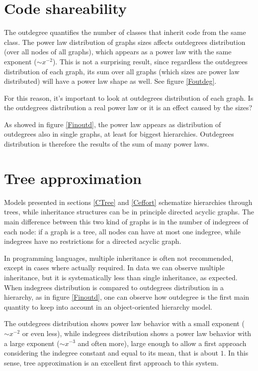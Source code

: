 \section{Code shareability}
The outdegree quantifies the number of classes that inherit code from the same class. The power law distribution of graphs sizes affects outdegrees distribution (over all nodes of all graphs), which appears as a power law with the same exponent ($\sim x^{-2}$). This is not a surprising result, since regardless the outdegrees distribution of each graph, its sum over all graphs (which sizes are power law distributed) will have a power law shape as well. See figure \ref{Foutdeg}.

For this reason, it's important to look at outdegrees distribution of each graph. Is the outdegrees distribution a real power law or it is an effect caused by the sizes?

As showed in figure \ref{Finoutd}, the power law appears as distribution of outdegrees also in single graphs, at least for biggest hierarchies. Outdegrees distribution is therefore the results of the sum of many power laws.

\section{Tree approximation}
Models presented in sections \ref{CTree} and \ref{Ceffort} schematize hierarchies through trees, while inheritance structures can be in principle directed acyclic graphs. The main difference between this two kind of graphs is in the number of indegrees of each node: if a graph is a tree, all nodes can have at most one indegree, while indegrees have no restrictions for a directed acyclic graph.

In programming languages, multiple inheritance is often not recommended, except in cases where actually required. In data we can observe multiple inheritance, but it is systematically less than single inheritance, as expected. When indegrees distribution is compared to outdegrees distribution in a hierarchy, as in figure \ref{Finoutd}, one can observe how outdegree is the first main quantity to keep into account in an object-oriented hierarchy model.

The outdegrees distribution shows power law behavior with a small exponent ($\sim x^{-2}$ or even less), while indegrees distribution shows a power law behavior with a large exponent ($\sim x^{-3}$ and often more), large enough to allow a first approach considering the indegree constant and equal to its mean, that is about $1$. In this sense, tree approximation is an excellent first approach to this system.

